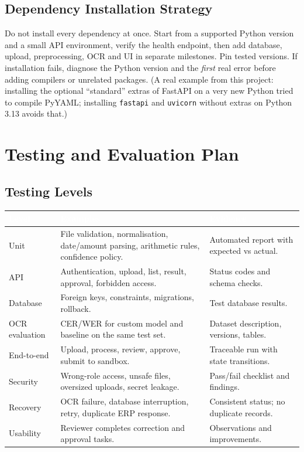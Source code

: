 \documentclass[11pt,a4paper]{report}
\newcommand{\hdr}[1]{\textcolor{white}{\sffamily\bfseries #1}}
\newcommand{\tblstart}{\rowcolors{2}{white}{rowgray}\arrayrulecolor{teal!60}}
\newcommand{\hdrrow}{\rowcolor{navy}}
\begin{document}
\section{Dependency Installation Strategy}
Do not install every dependency at once. Start from a supported Python version and a small API environment, verify the health endpoint, then add database, upload, preprocessing, OCR and UI in separate milestones. Pin tested versions. If installation fails, diagnose the Python version and the \emph{first} real error before adding compilers or unrelated packages. (A real example from this project: installing the optional ``standard'' extras of FastAPI on a very new Python tried to compile PyYAML; installing \texttt{fastapi} and \texttt{uvicorn} without extras on Python 3.13 avoids that.)

\chapter{Testing and Evaluation Plan}
\section{Testing Levels}
{\tblstart\small
\begin{longtable}{L{3.0cm}L{5.8cm}L{5.0cm}}
\hdrrow \hdr{Level} & \hdr{Examples} & \hdr{Evidence}\\ \endhead
Unit & File validation, normalisation, date/amount parsing, arithmetic rules, confidence policy. & Automated report with expected vs actual.\\
API & Authentication, upload, list, result, approval, forbidden access. & Status codes and schema checks.\\
Database & Foreign keys, constraints, migrations, rollback. & Test database results.\\
OCR evaluation & CER/WER for custom model and baseline on the same test set. & Dataset description, versions, tables.\\
End-to-end & Upload, process, review, approve, submit to sandbox. & Traceable run with state transitions.\\
Security & Wrong-role access, unsafe files, oversized uploads, secret leakage. & Pass/fail checklist and findings.\\
Recovery & OCR failure, database interruption, retry, duplicate ERP response. & Consistent status; no duplicate records.\\
Usability & Reviewer completes correction and approval tasks. & Observations and improvements.\\
\hline
\end{longtable}}
\end{document}
